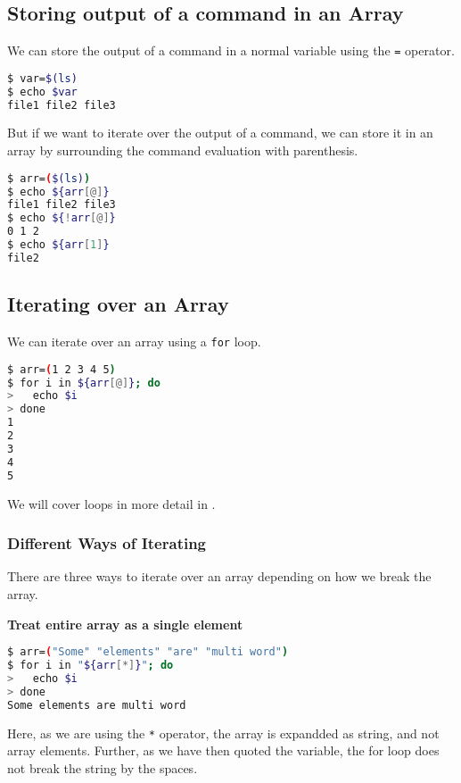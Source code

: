 \subsection{Storing output of a command in an Array}

We can store the output of a command in a normal variable using the \lstinline{=} operator.

\begin{lstlisting}[language=bash]
$ var=$(ls)
$ echo $var
file1 file2 file3
\end{lstlisting}

But if we want to iterate over the output of a command, we can store it in an array by surrounding the command evaluation with parenthesis.

\begin{lstlisting}[language=bash]
$ arr=($(ls))
$ echo ${arr[@]}
file1 file2 file3
$ echo ${!arr[@]}
0 1 2
$ echo ${arr[1]}
file2
\end{lstlisting}

\subsection{Iterating over an Array}

We can iterate over an array using a \lstinline{for} loop.

\begin{lstlisting}[language=bash]
$ arr=(1 2 3 4 5)
$ for i in ${arr[@]}; do
>   echo $i
> done
1
2
3
4
5
\end{lstlisting}

We will cover loops in more detail in .

\subsubsection{Different Ways of Iterating}

There are three ways to iterate over an array depending on how we break the array.

\textbf{Treat entire array as a single element}

\begin{lstlisting}[language=bash]
$ arr=("Some" "elements" "are" "multi word")
$ for i in "${arr[*]}"; do
>   echo $i
> done
Some elements are multi word
\end{lstlisting}

Here, as we are using the \lstinline{*} operator, the array is expandded as string, and not array elements.
Further, as we have then quoted the variable, the for loop does not break the string by the spaces.

